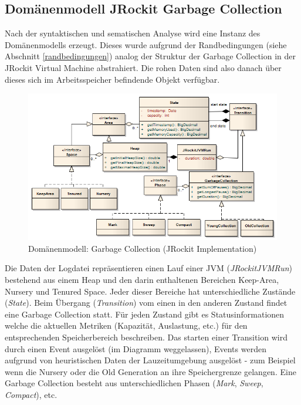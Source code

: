 \subsection{Domänenmodell JRockit Garbage Collection}\label{jrockit_domain_model}
Nach der syntaktischen und sematischen Analyse wird eine Instanz des Domänenmodells erzeugt. Dieses wurde aufgrund der Randbedingungen (siehe Abschnitt \ref{randbedingungen}) analog der Struktur der Garbage Collection in der JRockit Virtual Machine abstrahiert. Die rohen Daten sind also danach über dieses sich im Arbeitsspeicher befindende Objekt verfügbar. \begin{landscape}
 \begin{figure}[H]
  	\centering
        	\includegraphics[width=18.2cm]{images/jrockit_extension_domain}
	\caption{Domänenmodell: Garbage Collection (JRockit Implementation)}
\end{figure}
\end{landscape}
Die Daten der Logdatei repräsentieren einen Lauf einer JVM (\textit{JRockitJVMRun}) bestehend aus einem Heap und den darin enthaltenen Bereichen Keep-Area, Nursery und Tenured Space. Jeder dieser Bereiche hat unterschiedliche Zustände (\textit{State}). Beim Übergang (\textit{Transition}) vom einen in den anderen Zustand findet eine Garbage Collection statt. Für jeden Zustand gibt es Statusinformationen welche die aktuellen Metriken (Kapazität, Auslastung, etc.) für den entsprechenden Speicherbereich beschreiben. Das starten einer Transition wird durch einen Event ausgelöst (im Diagramm weggelassen), Events werden aufgrund von heuristischen Daten der Lauzeitumgebung ausgelöst - zum Beispiel wenn die Nursery oder die Old Generation an ihre Speichergrenze gelangen. Eine Garbage Collection besteht aus unterschiedlichen Phasen (\textit{Mark}, \textit{Sweep}, \textit{Compact}), etc.

